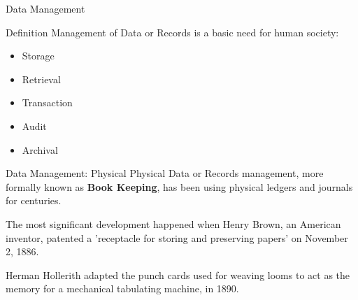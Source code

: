 \documentclass[aspectratio=169, xcolor=dvipsnames]{beamer}
\begin{document}
\begin{frame}{Data Management}
    \begin{block}{Definition}
        Management of Data or Records is a basic need for human society:
        \begin{itemize}[<+->]
            \item Storage
            \item Retrieval
            \item Transaction
            \item Audit
            \item Archival
        \end{itemize}
    \end{block}
    \vspace{0.5em}
\end{frame}

\begin{frame}{Data Management: Physical}
    Physical Data or Records management, more formally known as \textbf{Book Keeping}, has been using physical ledgers and journals for centuries.
    
    \vspace{1em}
    The most significant development happened when Henry Brown, an American inventor, patented a 'receptacle for storing and preserving papers' on November 2, 1886.
    
    \vspace{1em}
    Herman Hollerith adapted the punch cards used for weaving looms to act as the memory for a mechanical tabulating machine, in 1890.
\end{frame}
\end{document}
